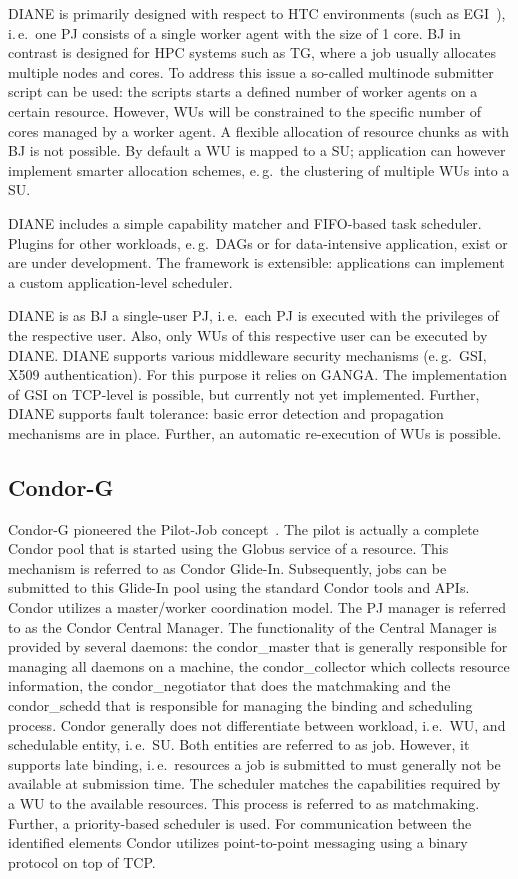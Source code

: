 \documentclass[conference,final]{IEEEtran}
\newcommand{\upp}{\vspace*{-0.5em}}
\begin{document}
DIANE is primarily designed with respect to HTC environments (such as
EGI~\cite{egi}), i.\,e.\ one PJ consists of a single worker agent with the
size of 1 core. BJ in contrast is designed for HPC systems such as TG,
where a job usually allocates multiple nodes and cores. To address this issue
a so-called multinode submitter script can be used: the scripts starts a
defined number of worker agents on a certain resource. However, WUs will be
constrained to the specific number of cores managed by a worker agent. A
flexible allocation of resource chunks as with BJ is not possible. By
default a WU is mapped to a SU; application can however implement smarter
allocation schemes, e.\,g.\ the clustering of multiple WUs into a SU.

DIANE includes a simple capability matcher and FIFO-based task scheduler.
Plugins for other workloads, e.\,g.\ DAGs or for data-intensive
application, exist or are under development. The framework is extensible:
applications can implement a custom application-level scheduler.


DIANE is as BJ a single-user PJ, i.\,e.\ each PJ is executed with the
privileges of the respective user. Also, only WUs of this respective user can be
executed by DIANE. DIANE supports various middleware security mechanisms
(e.\,g.\ GSI, X509 authentication). For this purpose it relies on GANGA. The
implementation of GSI on TCP-level is possible, but currently not yet
implemented. Further, DIANE supports fault tolerance: basic error detection and
propagation mechanisms are in place. Further, an automatic re-execution of WUs
is possible.

\upp
\subsection{Condor-G\upp\upp}

Condor-G pioneered the Pilot-Job concept~\cite{condor-g}. The pilot is
actually a complete Condor pool that is started using the Globus service of a
resource. This mechanism is referred to as Condor Glide-In. Subsequently, jobs can be submitted to this Glide-In pool using the
standard Condor tools and APIs. Condor utilizes a master/worker coordination
model. The PJ manager is referred to as the Condor Central Manager. The
functionality of the Central Manager is provided by several daemons: the
condor\_master that is generally responsible for managing all daemons on a
machine, the condor\_collector which collects resource information, the
condor\_negotiator that does the matchmaking and the condor\_schedd that is
responsible for managing the binding and scheduling process. Condor generally
does not differentiate between workload, i.\,e.\ WU, and schedulable entity,
i.\,e.\ SU. Both entities are referred to as job. However, it supports late
binding, i.\,e.\ resources a job is submitted to must generally not be available
at submission time. The scheduler matches the capabilities required by a WU to
the available resources. This process is referred to as matchmaking. Further, a
priority-based scheduler is used. For communication between the identified
elements Condor utilizes point-to-point messaging using a binary protocol on top
of TCP.
\end{document}
